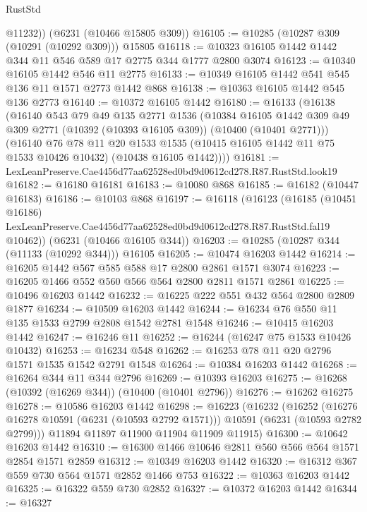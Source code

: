 \begin{lexlean}{RustStd}
\begin{coremodule}
{{        @11232))
    (@6231 (@10466 @15805 @309))
@16105 := @10285 (@10287 @309 (@10291 (@10292 @309))) @15805
@16118 := @10323 @16105 @1442 @1442 @344 @11 @546 @589 @17 @2775 @344 @1777 @2800 @3074
@16123 := @10340 @16105 @1442 @546 @11 @2775
@16133 := @10349 @16105 @1442 @541 @545 @136 @11 @1571 @2773 @1442 @868
@16138 := @10363 @16105 @1442 @545 @136 @2773
@16140 := @10372 @16105 @1442
@16180 := @16133
    (@16138
      (@16140
        @543
        @79
        @49
        @135
        @2771
        @1536
        (@10384
          @16105
          @1442
          @309
          @49
          @309
          @2771
          (@10392 (@10393 @16105 @309))
          (@10400 (@10401 @2771)))
        (@16140
          @76
          @78
          @11
          @20
          @1533
          @1535
          (@10415 @16105 @1442 @11 @75 @1533 @10426 @10432)
          (@10438 @16105 @1442))))
@16181 := LexLeanPreserve.Cae4456d77aa62528ed0bd9d0612cd278.R87.RustStd.look19
@16182 := @16180 @16181
@16183 := @10080 @868
@16185 := @16182 (@10447 @16183)
@16186 := @10103 @868
@16197 := @16118
    (@16123
      (@16185
        (@10451 @16186)
        LexLeanPreserve.Cae4456d77aa62528ed0bd9d0612cd278.R87.RustStd.fal19
        @10462))
    (@6231 (@10466 @16105 @344))
@16203 := @10285 (@10287 @344 (@11133 (@10292 @344))) @16105
@16205 := @10474 @16203 @1442
@16214 := @16205 @1442 @567 @585 @588 @17 @2800 @2861 @1571 @3074
@16223 := @16205 @1466 @552 @560 @566 @564 @2800 @2811 @1571 @2861
@16225 := @10496 @16203 @1442
@16232 := @16225 @222 @551 @432 @564 @2800 @2809 @1877
@16234 := @10509 @16203 @1442
@16244 := @16234 @76 @550 @11 @135 @1533 @2799 @2808 @1542 @2781 @1548
@16246 := @10415 @16203 @1442
@16247 := @16246 @11
@16252 := @16244 (@16247 @75 @1533 @10426 @10432)
@16253 := @16234 @548
@16262 := @16253 @78 @11 @20 @2796 @1571 @1535 @1542 @2791 @1548
@16264 := @10384 @16203 @1442
@16268 := @16264 @344 @11 @344 @2796
@16269 := @10393 @16203
@16275 := @16268 (@10392 (@16269 @344)) (@10400 (@10401 @2796))
@16276 := @16262 @16275
@16278 := @10586 @16203 @1442
@16298 := @16223
    (@16232
      (@16252
        (@16276 @16278 @10591 (@6231 (@10593 @2792 @1571)))
        @10591
        (@6231 (@10593 @2782 @2799)))
      @11894
      @11897
      @11900
      @11904
      @11909
      @11915)
@16300 := @10642 @16203 @1442
@16310 := @16300 @1466 @10646 @2811 @560 @566 @564 @1571 @2854 @1571 @2859
@16312 := @10349 @16203 @1442
@16320 := @16312 @367 @559 @730 @564 @1571 @2852 @1466 @753
@16322 := @10363 @16203 @1442
@16325 := @16322 @559 @730 @2852
@16327 := @10372 @16203 @1442
@16344 := @16327
}}
\end{coremodule}
\end{lexlean}
